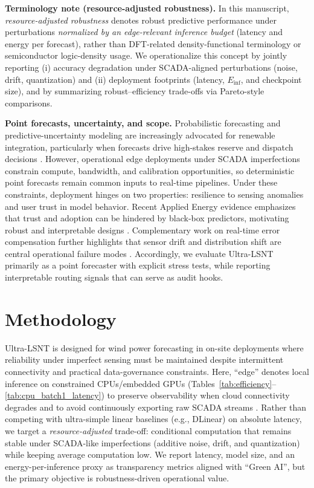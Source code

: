 \documentclass[review,3p,times]{elsarticle}
\begin{document}
\noindent\textbf{Terminology note (resource-adjusted robustness).}
In this manuscript, \emph{resource-adjusted robustness} denotes robust predictive performance under perturbations \emph{normalized by an edge-relevant inference budget} (latency and energy per forecast), rather than DFT-related density-functional terminology or semiconductor logic-density usage. We operationalize this concept by jointly reporting (i) accuracy degradation under SCADA-aligned perturbations (noise, drift, quantization) and (ii) deployment footprints (latency, $E_{\text{inf}}$, and checkpoint size), and by summarizing robust--efficiency trade-offs via Pareto-style comparisons.


\noindent\textbf{Point forecasts, uncertainty, and scope.}
Probabilistic forecasting and predictive-uncertainty modeling are increasingly advocated for renewable integration, particularly when forecasts drive high-stakes reserve and dispatch decisions \cite{wang2025review}. However, operational edge deployments under SCADA imperfections constrain compute, bandwidth, and calibration opportunities, so deterministic point forecasts remain common inputs to real-time pipelines. Under these constraints, deployment hinges on two properties: resilience to sensing anomalies and user trust in model behavior. Recent Applied Energy evidence emphasizes that trust and adoption can be hindered by black-box predictors, motivating robust and interpretable designs \cite{liao2024trust}. Complementary work on real-time error compensation further highlights that sensor drift and distribution shift are central operational failure modes \cite{zhu2025realtime}. Accordingly, we evaluate Ultra-LSNT primarily as a point forecaster with explicit stress tests, while reporting interpretable routing signals that can serve as audit hooks.

\section{Methodology}
\label{sec:method}

Ultra-LSNT is designed for wind power forecasting in on-site deployments where reliability under imperfect sensing must be maintained despite intermittent connectivity and practical data-governance constraints. Here, ``edge'' denotes local inference on constrained CPUs/embedded GPUs (Tables~\ref{tab:efficiency}--\ref{tab:cpu_batch1_latency}) to preserve observability when cloud connectivity degrades and to avoid continuously exporting raw SCADA streams \cite{mwangi2024sdniiotedge,gooi2023edgeintelligence}. Rather than competing with ultra-simple linear baselines (e.g., DLinear) \cite{zeng2023aaai} on absolute latency, we target a \emph{resource-adjusted} trade-off: conditional computation that remains stable under SCADA-like imperfections (additive noise, drift, and quantization) while keeping average computation low. We report latency, model size, and an energy-per-inference proxy as transparency metrics aligned with ``Green AI'', but the primary objective is robustness-driven operational value.
\end{document}
